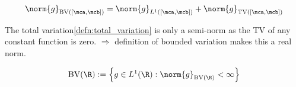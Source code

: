 \begin{defnbox}\nospacing
    \begin{defn}\label{defn:bounded_variation}
       \begin{align}
         \norm{g}_{\text{BV}([\mca,\mcb])}=\norm{g}_{L^1([\mca,\mcb])}+\norm{g}_{\text{TV}([\mca,\mcb])}
       \end{align}
    \end{defn}
\end{defnbox}
\begin{explanationbox}\nospacing
    \begin{explanation}
        The total variation\cref{defn:total_variation} is only a semi-norm as the TV of any constant function is zero.
        $\Rightarrow$ definition of bounded variation makes this a real norm.
    \end{explanation}
\end{explanationbox}
\begin{defnbox}\nospacing
    \begin{defn}\label{defn:bounded_variation_functionspace}
        \begin{align}
          \text{BV}(\R):=\left\{g\in L^{1}(\R): \norm{g}_{\text{BV}(\R)}<\infty\right\}
        \end{align}
    \end{defn}
\end{defnbox}
